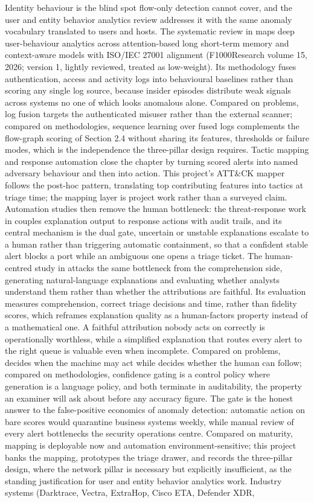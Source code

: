 Identity behaviour is the blind spot flow-only detection cannot cover, and the user and entity behavior analytics review addresses it with the same anomaly vocabulary translated to users and hosts. The systematic review in \cite{k39} maps deep user-behaviour analytics across attention-based long short-term memory and context-aware models with ISO/IEC 27001 alignment (F1000Research volume 15, 2026; version 1, lightly reviewed, treated as low-weight). Its methodology fuses authentication, access and activity logs into behavioural baselines rather than scoring any single log source, because insider episodes distribute weak signals across systems no one of which looks anomalous alone. Compared on problems, log fusion targets the authenticated misuser rather than the external scanner; compared on methodologies, sequence learning over fused logs complements the flow-graph scoring of Section 2.4 without sharing its features, thresholds or failure modes, which is the independence the three-pillar design requires. Tactic mapping and response automation close the chapter by turning scored alerts into named adversary behaviour and then into action. This project's ATT\&CK mapper follows the post-hoc pattern, translating top contributing features into tactics at triage time; the mapping layer is project work rather than a surveyed claim. Automation studies then remove the human bottleneck: the threat-response work in \cite{k40} couples explanation output to response actions with audit trails, and its central mechanism is the dual gate, uncertain or unstable explanations escalate to a human rather than triggering automatic containment, so that a confident stable alert blocks a port while an ambiguous one opens a triage ticket. The human-centred study in \cite{k38} attacks the same bottleneck from the comprehension side, generating natural-language explanations and evaluating whether analysts understand them rather than whether the attributions are faithful. Its evaluation measures comprehension, correct triage decisions and time, rather than fidelity scores, which reframes explanation quality as a human-factors property instead of a mathematical one. A faithful attribution nobody acts on correctly is operationally worthless, while a simplified explanation that routes every alert to the right queue is valuable even when incomplete. Compared on problems, \cite{k40} decides when the machine may act while \cite{k38} decides whether the human can follow; compared on methodologies, confidence gating is a control policy where generation is a language policy, and both terminate in auditability, the property an examiner will ask about before any accuracy figure. The gate is the honest answer to the false-positive economics of anomaly detection: automatic action on bare scores would quarantine business systems weekly, while manual review of every alert bottlenecks the security operations centre. Compared on maturity, mapping is deployable now and automation environment-sensitive; this project banks the mapping, prototypes the triage drawer, and records the three-pillar design, where the network pillar is necessary but explicitly insufficient, as the standing justification for user and entity behavior analytics work. Industry systems (Darktrace, Vectra, ExtraHop, Cisco ETA, Defender XDR, 